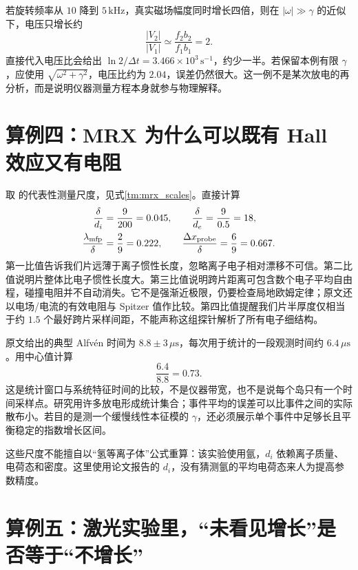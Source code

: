 若旋转频率从 $10$ 降到 $5\,\mathrm{kHz}$，真实磁场幅度同时增长四倍，则在 $|\omega|\gg\gamma$ 的近似下，电压只增长约
\begin{equation}
 \frac{|V_2|}{|V_1|}\simeq\frac{f_2b_2}{f_1b_1}=2.
\end{equation}
直接代入电压比会给出 $\ln2/\Delta t=3.466\times10^3\,\mathrm{s^{-1}}$，约少一半。若保留本例有限 $\gamma$，应使用 $\sqrt{\omega^2+\gamma^2}$，电压比约为 $2.04$，误差仍然很大。这一例不是某次放电的再分析，而是说明仪器测量方程本身就参与物理解释。

\section{算例四：MRX 为什么可以既有 Hall 效应又有电阻}

取 \citet{TMJaraAlmonte2016} 的代表性测量尺度，见式\eqref{tm:mrx_scales}。直接计算
\begin{align}
 \frac{\delta}{d_i}&=\frac9{200}=0.045,\qquad
 \frac{\delta}{d_e}=\frac9{0.5}=18,\\
 \frac{\lambda_{\rm mfp}}{\delta}&=\frac29=0.222,\qquad
 \frac{\Delta x_{\rm probe}}{\delta}=\frac69=0.667.
\end{align}
第一比值告诉我们片远薄于离子惯性长度，忽略离子电子相对漂移不可信。第二比值说明片整体比电子惯性长度大。第三比值说明跨片距离可包含数个电子平均自由程，碰撞电阻并不自动消失。它不是强渐近极限，仍要检查局地欧姆定律；原文还以电场/电流的有效电阻与 Spitzer 值作比较。第四比值提醒我们片半厚度仅相当于约 $1.5$ 个最好跨片采样间距，不能声称这组探针解析了所有电子细结构。

原文给出的典型 Alfv\'en 时间为 $8.8\pm3\,\mu\mathrm s$，每次用于统计的一段观测时间约 $6.4\,\mu\mathrm s$。用中心值计算
\begin{equation}
 \frac{6.4}{8.8}=0.73.
\end{equation}
这是统计窗口与系统特征时间的比较，不是仪器带宽，也不是说每个岛只有一个时间采样点。研究用许多放电形成统计集合；事件平均的误差可以比事件之间的实际散布小。若目的是测一个缓慢线性本征模的 $\gamma$，还必须展示单个事件中足够长且平衡稳定的指数增长区间。

这些尺度不能擅自以“氢等离子体”公式重算：该实验使用氩，$d_i$ 依赖离子质量、电荷态和密度。这里使用论文报告的 $d_i$，没有猜测氩的平均电荷态来人为提高参数精度。

\section{算例五：激光实验里，“未看见增长”是否等于“不增长”}

